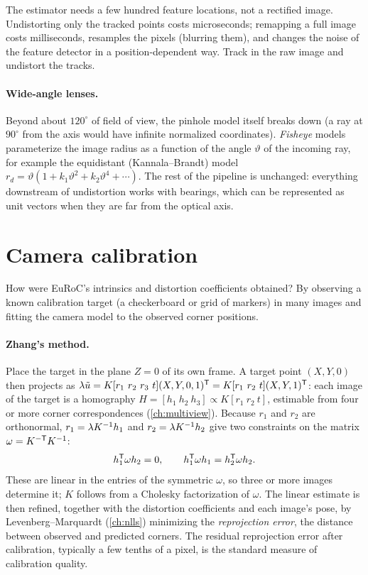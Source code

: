 \begin{keyidea}
The estimator needs a few hundred feature locations, not a rectified image. Undistorting only the tracked points costs microseconds; remapping a full image
costs milliseconds, resamples the pixels (blurring them), and changes the noise of the feature detector in a position-dependent way. Track in the raw image and
undistort the tracks.
\end{keyidea}

\paragraph{Wide-angle lenses.} Beyond about $120^\circ$ of field of view, the pinhole model itself breaks down (a ray at $90^\circ$ from the axis would have infinite
normalized coordinates). \emph{Fisheye} models parameterize the image radius as a function of the angle $\vartheta$ of the incoming ray, for example the
equidistant (Kannala--Brandt) model $r_d = \vartheta(1 + k_1\vartheta^2 + k_2\vartheta^4 + \cdots)$. The rest of the pipeline is unchanged: everything downstream of
undistortion works with bearings, which can be represented as unit vectors when they are far from the optical axis.

\section{Camera calibration}

How were EuRoC's intrinsics and distortion coefficients obtained? By observing a known calibration target (a checkerboard or grid of markers) in many
images and fitting the camera model to the observed corner positions.

\paragraph{Zhang's method.} Place the target in the plane $Z = 0$ of its own frame. A target point $(X, Y, 0)$ then projects as
$\lambda\tilde u = K[r_1\ r_2\ r_3\ t](X, Y, 0, 1)\T = K[r_1\ r_2\ t](X, Y, 1)\T$: each image of the target is a homography $H = [h_1\ h_2\ h_3] \propto K[r_1\ r_2\ t]$, estimable from
four or more corner correspondences (\cref{ch:multiview}). Because $r_1$ and $r_2$ are orthonormal, $r_1 = \lambda K^{-1} h_1$ and $r_2 = \lambda K^{-1} h_2$ give two
constraints on the matrix $\omega = K^{-\mathsf{T}} K^{-1}$:
\begin{equation}
  h_1^{\mathsf{T}}\omega h_2 = 0, \qquad h_1^{\mathsf{T}}\omega h_1 = h_2^{\mathsf{T}}\omega h_2 .
\end{equation}
These are linear in the entries of the symmetric $\omega$, so three or more images determine it; $K$ follows from a Cholesky factorization of $\omega$. The linear
estimate is then refined, together with the distortion coefficients and each image's pose, by Levenberg--Marquardt (\cref{ch:nlls}) minimizing the
\emph{reprojection error}, the distance between observed and predicted corners. The residual reprojection error after calibration, typically a few tenths of a
pixel, is the standard measure of calibration quality.


